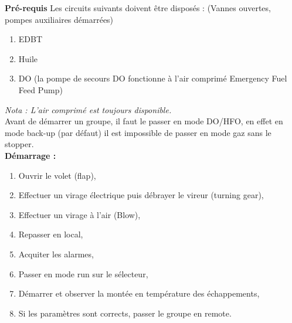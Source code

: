 \documentclass[12pt,a4paper]{article}
\begin{document}
%

\textbf{ Pré-requis}
Les circuits suivants doivent être disposés :
(Vannes ouvertes, pompes auxiliaires démarrées)

\begin{enumerate}
 \item EDBT
 \item Huile
 \item DO (la pompe de secours DO fonctionne à l'air comprimé Emergency Fuel Feed Pump)
\end{enumerate}

\emph{Nota : L'air comprimé est toujours disponible.}\\
Avant de démarrer un groupe, il faut le passer en mode DO/HFO, en effet en mode back-up (par défaut) il est impossible de passer en mode gaz sans le stopper.\\
%
\textbf{Démarrage :}
\begin{enumerate}[resume]
 \item Ouvrir le volet (flap),
 \item Effectuer un virage électrique puis débrayer le vireur (turning gear),
 \item Effectuer un virage à l'air (Blow),
 \item Repasser en local,
 \item Acquiter les alarmes,
 \item Passer en mode run sur le sélecteur,
 \item Démarrer et observer la montée en température des échappements, 
 \item Si les paramètres sont corrects, passer le groupe en remote.
\end{enumerate}
\end{document}
